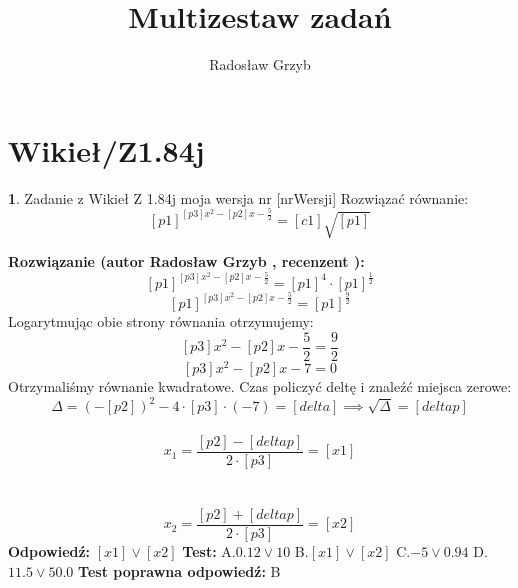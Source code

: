 \documentclass[12pt, a4paper]{article}
\title{Multizestaw zadań}
\author{Radosław Grzyb}
\date{}
\theoremstyle{definition} %
\newtheorem{zad}{}
\newcommand{\kategoria}[1]{\section{#1}} %
\newcommand{\zadStart}[1]{\begin{zad}#1\newline} %
\newcommand{\zadStop}{\end{zad}}   %
\newcommand{\rozwStart}[2]{\noindent \textbf{Rozwiązanie (autor #1 , recenzent #2): }\newline} %
\newcommand{\rozwStop}{\newline}                                            %
\newcommand{\odpStart}{\noindent \textbf{Odpowiedź:}\newline}    %
\newcommand{\odpStop}{\newline}                                             %
\newcommand{\testStart}{\noindent \textbf{Test:}\newline} %
\newcommand{\testStop}{\newline} %
\newcommand{\kluczStart}{\noindent \textbf{Test poprawna odpowiedź:}\newline} %
\newcommand{\kluczStop}{\newline} %
\begin{document}
\maketitle
\kategoria{Wikieł/Z1.84j}
\zadStart{Zadanie z Wikieł Z 1.84j moja wersja nr [nrWersji]}
Rozwiązać równanie:
$$[p1]^{[p3]x^{2}-[p2]x-\frac{5}{2}}=[c1]\sqrt{[p1]}$$
\zadStop
\rozwStart{Radosław Grzyb}{}
$$[p1]^{[p3]x^{2}-[p2]x-\frac{5}{2}}=[p1]^{4}\cdot[p1]^{\frac{1}{2}}$$
$$[p1]^{[p3]x^{2}-[p2]x-\frac{5}{2}}=[p1]^{\frac{9}{2}}$$
Logarytmując obie strony równania otrzymujemy:
$$[p3]x^{2}-[p2]x-\frac{5}{2}=\frac{9}{2}$$
$$[p3]x^{2}-[p2]x-7=0$$
Otrzymaliśmy równanie kwadratowe. Czas policzyć deltę i znaleźć miejsca zerowe:
$$\Delta=(-[p2])^{2}-4\cdot[p3]\cdot(-7)=[delta]\implies \sqrt{\Delta}=[deltap]$$\\
$$x_{1}=\frac{[p2]-[deltap]}{2\cdot[p3]}=[x1]$$\\\\
$$x_{2}=\frac{[p2]+[deltap]}{2\cdot[p3]}=[x2]$$
\rozwStop
\odpStart
$[x1] \vee [x2]$
\odpStop
\testStart
A.$0.12 \vee 10$
B.$[x1] \vee [x2]$
C.$-5 \vee 0.94$
D.$11.5 \vee 50.0$
\testStop
\kluczStart
B
\kluczStop
\end{document}
